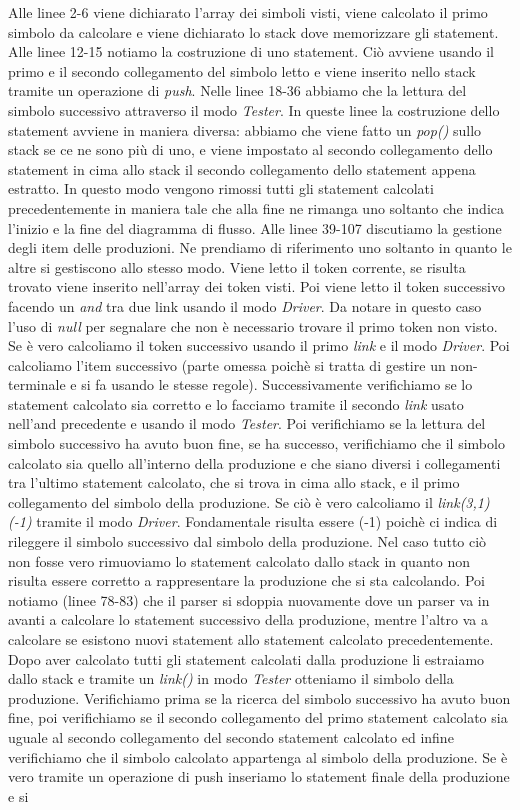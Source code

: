 Alle linee 2-6 viene dichiarato l'array dei simboli visti, viene calcolato il primo simbolo da calcolare e viene dichiarato lo stack dove memorizzare gli statement. Alle linee 12-15 notiamo la costruzione di uno statement. Ciò avviene usando il primo e il secondo collegamento del simbolo letto e viene inserito nello stack tramite un operazione di \textit{push}. Nelle linee 18-36 abbiamo che la lettura del simbolo successivo attraverso il modo \textit{Tester}. In queste linee la costruzione dello statement avviene in maniera diversa: abbiamo che viene fatto un \textit{pop()} sullo stack se ce ne sono più di uno, e viene impostato al secondo collegamento dello statement in cima allo stack il secondo collegamento dello statement appena estratto. In questo modo vengono rimossi tutti gli statement calcolati precedentemente in maniera tale che alla fine ne rimanga uno soltanto che indica l'inizio e la fine del diagramma di flusso. Alle linee 39-107 discutiamo la gestione degli item delle produzioni. Ne prendiamo di riferimento uno soltanto in quanto le altre si gestiscono allo stesso modo. Viene letto il token corrente, se risulta trovato viene inserito nell'array dei token visti. Poi viene letto il token successivo facendo un \textit{and} tra due link usando il modo \textit{Driver}. Da notare in questo caso l'uso di \textit{null} per segnalare che non è necessario trovare il primo token non visto. Se è vero calcoliamo il token successivo usando il primo \textit{link} e il modo \textit{Driver}. Poi calcoliamo l'item successivo (parte omessa poichè si tratta di gestire un non-terminale e si fa usando le stesse regole). Successivamente verifichiamo se lo statement calcolato sia corretto e lo facciamo tramite il secondo \textit{link} usato nell'and precedente e usando il modo \textit{Tester}. Poi verifichiamo se la lettura del simbolo successivo ha avuto buon fine, se ha successo, verifichiamo che il simbolo calcolato sia quello all'interno della produzione e che siano diversi i collegamenti tra l'ultimo statement calcolato, che si trova in cima allo stack, e il primo collegamento del simbolo della produzione. Se ciò è vero calcoliamo il \textit{link(3,1)(-1)} tramite il modo \textit{Driver}. Fondamentale risulta essere (-1) poichè ci indica di rileggere il simbolo successivo dal simbolo della produzione. Nel caso tutto ciò non fosse vero rimuoviamo lo statement calcolato dallo stack in quanto non risulta essere corretto a rappresentare la produzione che si sta calcolando. Poi notiamo (linee 78-83) che il parser si sdoppia nuovamente dove un parser va in avanti a calcolare lo statement successivo della produzione, mentre l'altro va a calcolare se esistono nuovi statement allo statement calcolato precedentemente. Dopo aver calcolato tutti gli statement calcolati dalla produzione li estraiamo dallo stack e tramite un \textit{link()} in modo \textit{Tester} otteniamo il simbolo della produzione. Verifichiamo prima se la ricerca del simbolo successivo ha avuto buon fine, poi verifichiamo se il secondo collegamento del primo statement calcolato sia uguale al secondo collegamento del secondo statement calcolato ed infine verifichiamo che il simbolo calcolato appartenga al simbolo della produzione. Se è vero tramite un operazione di push inseriamo lo statement finale della produzione e si 